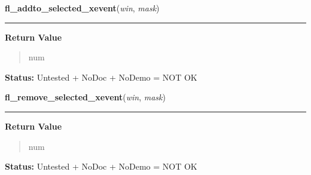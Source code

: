     \label{xformslib:library:fl_addto_selected_xevent}

    \vspace{0.5ex}

\hspace{.8\funcindent}\begin{boxedminipage}{\funcwidth}

    \raggedright \textbf{fl\_addto\_selected\_xevent}(\textit{win}, \textit{mask})

    \vspace{-1.5ex}

    \rule{\textwidth}{0.5\fboxrule}
\setlength{\parskip}{2ex}
\setlength{\parskip}{1ex}
      \textbf{Return Value}
    \vspace{-1ex}

      \begin{quote}
      num

      \end{quote}

\textbf{Status:} Untested + NoDoc + NoDemo = NOT OK



    \end{boxedminipage}

    \label{xformslib:library:fl_remove_selected_xevent}

    \vspace{0.5ex}

\hspace{.8\funcindent}\begin{boxedminipage}{\funcwidth}

    \raggedright \textbf{fl\_remove\_selected\_xevent}(\textit{win}, \textit{mask})

    \vspace{-1.5ex}

    \rule{\textwidth}{0.5\fboxrule}
\setlength{\parskip}{2ex}
\setlength{\parskip}{1ex}
      \textbf{Return Value}
    \vspace{-1ex}

      \begin{quote}
      num

      \end{quote}

\textbf{Status:} Untested + NoDoc + NoDemo = NOT OK



    \end{boxedminipage}

